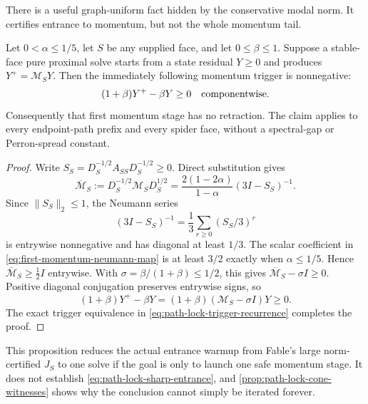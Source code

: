 \documentclass[11pt]{article}
\begin{document}
There is a useful graph-uniform fact hidden by the conservative modal norm.
It certifies entrance to momentum, but not the whole momentum tail.

\begin{proposition}
\label{prop:first-momentum-safe}
Let \(0<\alpha\leq1/5\), let \(S\) be any supplied face, and let
\(0\leq\beta\leq1\).  Suppose a stable-face pure proximal solve starts from
a state residual \(Y\geq0\) and produces \(Y^+=\mathcal M_SY\).  Then the
immediately following momentum trigger is nonnegative:
\begin{equation}
 (1+\beta)Y^+-\beta Y\geq0
 \quad\hbox{componentwise}.
 \label{eq:first-momentum-safe}
\end{equation}
Consequently that first momentum stage has no retraction.  The claim applies
to every endpoint-path prefix and every spider face, without a spectral-gap
or Perron-spread constant.
\end{proposition}

\begin{proof}
Write \(S_S=D_S^{-1/2}A_{SS}D_S^{-1/2}\geq0\).  Direct substitution gives
\begin{equation}
 \overline{\mathcal M}_S
 :=D_S^{-1/2}\mathcal M_SD_S^{1/2}
 =\frac{2(1-2\alpha)}{1-\alpha}(3I-S_S)^{-1}.
 \label{eq:first-momentum-neumann-map}
\end{equation}
Since \(\lVert S_S\rVert_2\leq1\), the Neumann series
\begin{equation}
 (3I-S_S)^{-1}=\frac13\sum_{r\geq0}(S_S/3)^r
 \label{eq:first-momentum-neumann-series}
\end{equation}
is entrywise nonnegative and has diagonal at least \(1/3\).  The scalar
coefficient in \eqref{eq:first-momentum-neumann-map} is at least \(3/2\)
exactly when \(\alpha\leq1/5\).  Hence
\(\overline{\mathcal M}_S\geq\frac12I\) entrywise.  With
\(\sigma=\beta/(1+\beta)\leq1/2\), this gives
\(\overline{\mathcal M}_S-\sigma I\geq0\).  Positive diagonal conjugation
preserves entrywise signs, so
\[
 (1+\beta)Y^+-\beta Y
 =(1+\beta)(\mathcal M_S-\sigma I)Y\geq0.
\]
The exact trigger equivalence in
\eqref{eq:path-lock-trigger-recurrence} completes the proof.
\end{proof}

This proposition reduces the actual entrance warmup from Fable's large
norm-certified \(J_S\) to one solve if the goal is only to launch one safe
momentum stage.  It does not establish
\eqref{eq:path-lock-sharp-entrance}, and
\cref{prop:path-lock-cone-witnesses} shows why the conclusion cannot simply
be iterated forever.
\end{document}
